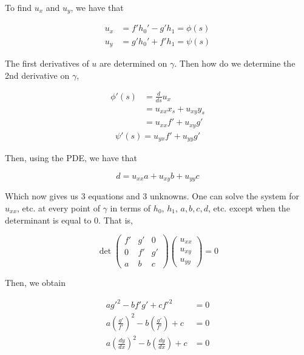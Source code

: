 \documentclass{article}
\newtheorem{one minute paper}[theorem]{One Minute Paper}
\begin{document}
To find $u_x$ and $u_y$, we have that 

\begin{align*}
    u_x &= f'h_0' - g'h_1 = \phi(s)\\
    u_y &= g'h_0' + f'h_1 = \psi(s)
\end{align*}

The first derivatives of $u$ are determined on $\gamma$. Then how do we determine the 2nd derivative on $\gamma$, 

\begin{align*}
    \phi'(s) &= \frac{d}{ds}u_x \\
    &= u_{xx}x_s + u_{xy}y_s \\
    &= u_{xx}f' + u_{xy}g' 
\end{align*}
\begin{align*}
    \psi'(s) = u_{yx}f' + u_{yy}g'
\end{align*}

Then, using the PDE, we have that 

\begin{equation}
    d = u_{xx}a + u_{xy}b + u_{yy}c
\end{equation}

Which now gives us 3 equations and 3 unknowns. One can solve the system for $u_{xx}$, etc. at every point of $\gamma$ in terms of $h_0$, $h_1$, $a,b,c,d$, etc. except when the determinant is equal to 0. 
That is, 

\begin{equation}
    \det\begin{pmatrix}
        f' & g' & 0 \\
        0 & f' & g' \\
        a & b & c
    \end{pmatrix}\begin{pmatrix}
        u_{xx} \\
        u_{xy} \\
        u_{yy}
    \end{pmatrix} = 0
\end{equation}

Then, we obtain 

\begin{align*}
    ag'^2 - bf'g' + cf'^2 &= 0 \\
    a\left( \frac{g'}{f'} \right)^2 - b\left(\frac{g'}{f'} \right) + c &= 0 \\
    a\left( \frac{dy}{dx} \right)^2 - b\left( \frac{dy}{dx} \right) + c &= 0
\end{align*}
\end{document}
